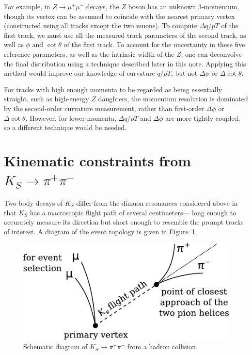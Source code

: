 \documentclass[12pt]{article}
\begin{document}
For example, in $Z\to\mu^+\mu^-$ decays, the $Z$ boson has an unknown
3-momentum, though its vertex can be assumed to coincide with the
nearest primary vertex (constructed using all tracks except the two
muons).  To compute $\Delta q/pT$ of the first track, we must use all
the measured track parameters of the second track, as well as $\phi$
and $\cot\theta$ of the first track.  To account for the uncertainty
in these five reference parameters, as well as the intrinsic width of
the $Z$, one can deconvolve the final distribution using a technique
described later in this note.  Applying this method would improve our
knowledge of curvature $q/pT$, but not $\Delta \phi$ or $\Delta
\cot\theta$.

For tracks with high enough momenta to be regarded as being
essentially straight, such as high-energy $Z$ daughters, the
momentum resolution is dominated by the second-order curvature
measurement, rather than first-order $\Delta \phi$ or $\Delta
\cot\theta$.  However, for lower momenta, $\Delta q/pT$ and $\Delta
\phi$ are more tightly coupled, so a different technique would be
needed.

\section{Kinematic constraints from $K_S \to \pi^+\pi^-$}

Two-body decays of $K_S$ differ from the dimuon resonances considered
above in that $K_S$ has a macroscopic flight path of several
centimeters--- long enough to accurately measure its direction but
short enough to resemble the prompt tracks of interest.  A diagram of
the event topology is given in Figure~\ref{fig:diagram}.

\begin{figure}
\begin{center}
\includegraphics[width=0.65\linewidth]{diagram.pdf}
\end{center}
\caption{Schematic diagram of $K_S \to \pi^+\pi^-$ from a hadron collision. \label{fig:diagram}}
\end{figure}
\end{document}

